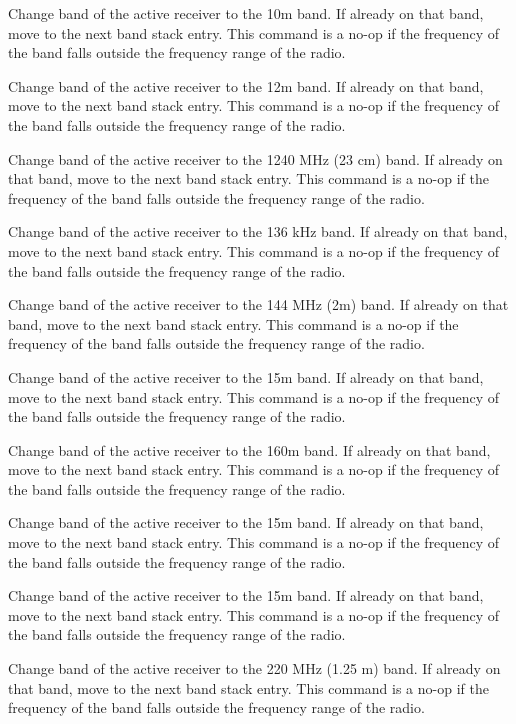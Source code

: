 \documentclass[12pt]{book}
\begin{document}
{Change band of the active receiver to the 10m band. If already on that band, move to
the next band stack entry. This command is a no-op if the frequency of the band falls outside the frequency
range of the radio.}

{Change band of the active receiver to the 12m band. If already on that band, move to
the next band stack entry. This command is a no-op if the frequency of the band falls outside the frequency range
of the radio.}

{Change band of the active receiver to the 1240 MHz (23 cm) band. If already on that band, move to
the next band stack entry. This command is a no-op if the frequency of the band falls outside the frequency
range of the radio.}

{Change band of the active receiver to the 136 kHz
band. If already on that band, move to the next band stack entry.
This command is a no-op if the frequency of the band falls outside the frequency
range of the radio.}

{Change band of the active receiver to the 144 MHz (2m) band. If already on that band, move to
the next band stack entry. This command is a no-op if the frequency of the band falls outside the frequency
range of the radio.}

{Change band of the active receiver to the 15m band. If already on that band, move to
the next band stack entry. This command is a no-op if the frequency of the band falls outside the frequency
range of the radio.}

{Change band of the active receiver to the 160m band. If already on that band, move to
the next band stack entry. This command is a no-op if the frequency of the band falls outside the frequency
range of the radio.}

{Change band of the active receiver to the 15m band. If already on that band, move to
the next band stack entry. This command is a no-op if the frequency of the band falls outside the frequency
range of the radio.}

{Change band of the active receiver to the 15m band. If already on that band, move to
the next band stack entry. This command is a no-op if the frequency of the band falls outside the frequency
range of the radio.}

{Change band of the active receiver to the 220 MHz (1.25 m) band. If already on that band, move to
the next band stack entry. This command is a no-op if the frequency of the band falls outside the frequency
range of the radio.}
\end{document}
